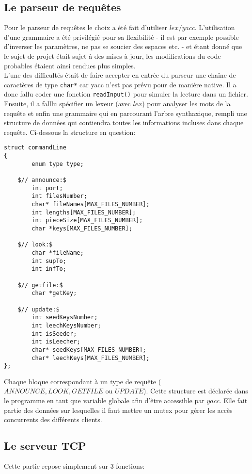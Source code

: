 \subsection{Le parseur de requêtes}
Pour le parseur de requêtes le choix a été fait d'utiliser $lex/yacc$. L'utilisation d'une grammaire a été privilégié pour sa flexibilité - il est par exemple possible d'inverser les paramètres, ne pas se soucier des espaces etc. - et étant donné que le sujet de projet était sujet à des mises à jour, les modifications du code probables étaient ainsi rendues plus simples.\\
L'une des difficultés était de faire accepter en entrée du parseur une chaîne de caractères de type \texttt{char*} car yacc n'est pas prévu pour de manière native. Il a donc fallu coder une fonction \texttt{readInput()} pour simuler la lecture dans un fichier. Ensuite, il a falllu spécifier un lexeur (avec $lex$) pour analyser les mots de la requête et enfin une grammaire qui en parcourant l'arbre synthaxique, rempli une structure de données qui contiendra toutes les informations incluses dans chaque requête. Ci-dessous la structure en question:

\begin{verbatim}
struct commandLine
{
        enum type type;

	$// announce:$
        int port;
        int filesNumber;
        char* fileNames[MAX_FILES_NUMBER];
        int lengths[MAX_FILES_NUMBER];
        int pieceSize[MAX_FILES_NUMBER];
        char *keys[MAX_FILES_NUMBER];

	$// look:$
        char *fileName;
        int supTo;
        int infTo;

	$// getfile:$
        char *getKey;

	$// update:$
        int seedKeysNumber;
        int leechKeysNumber;
        int isSeeder;
        int isLeecher;
        char* seedKeys[MAX_FILES_NUMBER];
        char* leechKeys[MAX_FILES_NUMBER];
};
\end{verbatim}

Chaque bloque correspondant à un type de requête ($ANNOUNCE, LOOK, GETFILE$ ou $UPDATE$).
Cette structure est déclarée dans le programme en tant que variable globale afin d'être accessible par $yacc$. Elle fait partie des données sur lesquelles il faut mettre un mutex pour gérer les accès concurrents des différents clients.

\subsection{Le serveur TCP}
Cette partie repose simplement sur 3 fonctions:

